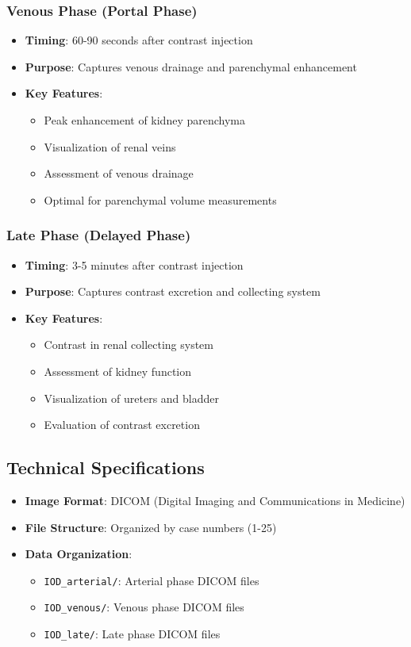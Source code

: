 \documentclass{article}
\begin{document}
\subsubsection{Venous Phase (Portal Phase)}
\begin{itemize}
    \item \textbf{Timing}: 60-90 seconds after contrast injection
    \item \textbf{Purpose}: Captures venous drainage and parenchymal enhancement
    \item \textbf{Key Features}:
    \begin{itemize}
        \item Peak enhancement of kidney parenchyma
        \item Visualization of renal veins
        \item Assessment of venous drainage
        \item Optimal for parenchymal volume measurements
    \end{itemize}
\end{itemize}

\subsubsection{Late Phase (Delayed Phase)}
\begin{itemize}
    \item \textbf{Timing}: 3-5 minutes after contrast injection
    \item \textbf{Purpose}: Captures contrast excretion and collecting system
    \item \textbf{Key Features}:
    \begin{itemize}
        \item Contrast in renal collecting system
        \item Assessment of kidney function
        \item Visualization of ureters and bladder
        \item Evaluation of contrast excretion
    \end{itemize}
\end{itemize}

\subsection{Technical Specifications}
\begin{itemize}
    \item \textbf{Image Format}: DICOM (Digital Imaging and Communications in Medicine)
    \item \textbf{File Structure}: Organized by case numbers (1-25)
    \item \textbf{Data Organization}:
    \begin{itemize}
        \item \texttt{IOD\_arterial/}: Arterial phase DICOM files
        \item \texttt{IOD\_venous/}: Venous phase DICOM files  
        \item \texttt{IOD\_late/}: Late phase DICOM files
    \end{itemize}
\end{itemize}
\end{document}
